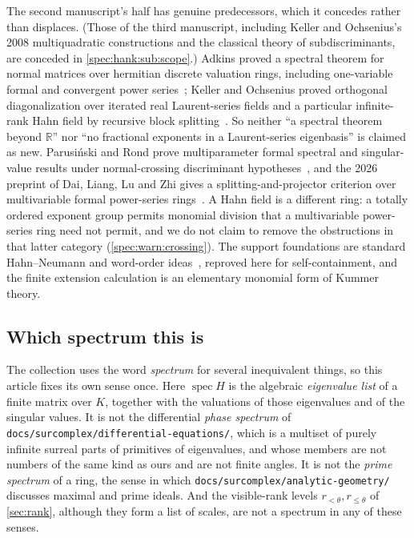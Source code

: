 \documentclass[11pt,a4paper]{article}
\numberwithin{equation}{section}
\theoremstyle{definition}
\theoremstyle{remark}
\newcommand{\R}{\mathbb R}
\newcommand{\spec}{\operatorname{spec}}
\begin{document}
The second manuscript's half has genuine predecessors, which it concedes
rather than displaces. (Those of the third manuscript, including Keller and
Ochsenius's 2008 multiquadratic constructions and the classical theory of
subdiscriminants, are conceded in \cref{spec:hank:sub:scope}.) Adkins proved a spectral theorem for normal matrices over
hermitian discrete valuation rings, including one-variable formal and
convergent power series~\cite{Adkins}; Keller and Ochsenius proved orthogonal
diagonalization over iterated real Laurent-series fields and a particular
infinite-rank Hahn field by recursive block splitting~\cite{KO}. So neither
``a spectral theorem beyond $\R$'' nor ``no fractional exponents in a
Laurent-series eigenbasis'' is claimed as new. Parusi\'nski and Rond prove
multiparameter formal spectral and singular-value results under
normal-crossing discriminant hypotheses~\cite{PR}, and the 2026 preprint of
Dai, Liang, Lu and Zhi gives a splitting-and-projector criterion over
multivariable formal power-series rings~\cite{DLLZ}. A Hahn field is a
different ring: a totally ordered exponent group permits monomial division
that a multivariable power-series ring need not permit, and we do not claim
to remove the obstructions in that latter category
(\cref{spec:warn:crossing}). The support foundations are standard
Hahn--Neumann and word-order ideas~\cite{Neumann,Higman}, reproved here for
self-containment, and the finite extension calculation is an elementary
monomial form of Kummer theory.

\subsection{Which spectrum this is}
\label{spec:sec:spectrumword}
The collection uses the word \emph{spectrum} for several inequivalent things,
so this article fixes its own sense once. Here $\spec H$ is the algebraic
\emph{eigenvalue list} of a finite matrix over $K$, together with the
valuations of those eigenvalues and of the singular values. It is not the
differential \emph{phase spectrum} of
\texttt{docs/surcomplex/differential-equations/}, which is a multiset of
purely infinite surreal parts of primitives of eigenvalues, and whose members
are not numbers of the same kind as ours and are not finite angles. It is not
the \emph{prime spectrum} of a ring, the sense in which
\texttt{docs/surcomplex/analytic-geometry/} discusses maximal and prime
ideals. And the visible-rank levels $r_{<\theta},r_{\le\theta}$ of
\cref{sec:rank}, although they form a list of scales, are not a spectrum in
any of these senses.
\end{document}
